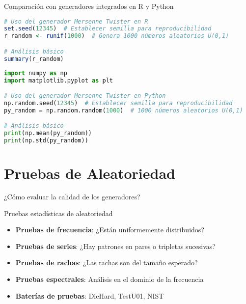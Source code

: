 \documentclass[aspectratio=169]{beamer}
\begin{document}
\begin{frame}{Comparación con generadores integrados en R y Python}
    \begin{lstlisting}[language=R]
# Uso del generador Mersenne Twister en R
set.seed(12345)  # Establecer semilla para reproducibilidad
r_random <- runif(1000)  # Genera 1000 números aleatorios U(0,1)

# Análisis básico
summary(r_random)
    \end{lstlisting}

    \begin{lstlisting}[language=Python]
import numpy as np
import matplotlib.pyplot as plt

# Uso del generador Mersenne Twister en Python
np.random.seed(12345)  # Establecer semilla para reproducibilidad
py_random = np.random.random(1000)  # 1000 números aleatorios U(0,1)

# Análisis básico
print(np.mean(py_random))
print(np.std(py_random))
    \end{lstlisting}
\end{frame}

\section{Pruebas de Aleatoriedad}

\begin{frame}{¿Cómo evaluar la calidad de los generadores?}
    \begin{block}{Pruebas estadísticas de aleatoriedad}
        \begin{itemize}
            \item \textbf{Pruebas de frecuencia}: ¿Están uniformemente distribuidos?
            \item \textbf{Pruebas de series}: ¿Hay patrones en pares o tripletas sucesivas?
            \item \textbf{Pruebas de rachas}: ¿Las rachas son del tamaño esperado?
            \item \textbf{Pruebas espectrales}: Análisis en el dominio de la frecuencia
            \item \textbf{Baterías de pruebas}: DieHard, TestU01, NIST
        \end{itemize}
    \end{block}
    
\end{frame}
\end{document}
